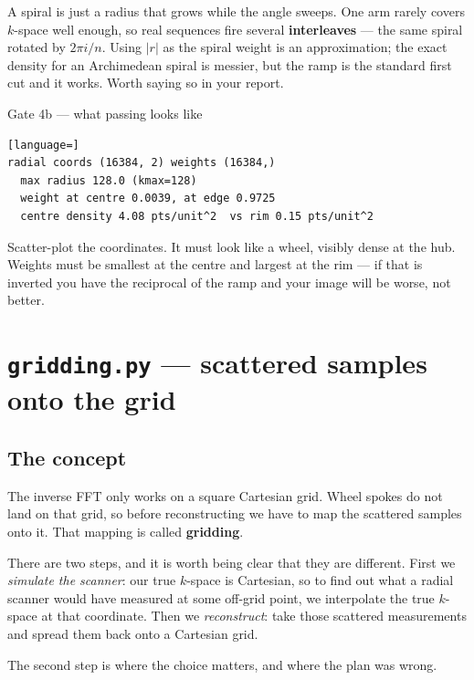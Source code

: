 \documentclass[11pt,a4paper]{article}
\begin{document}
A spiral is just a radius that grows while the angle sweeps. One arm rarely
covers $k$-space well enough, so real sequences fire several \textbf{interleaves}
--- the same spiral rotated by $2\pi i / n$. Using $|r|$ as the spiral weight is
an approximation; the exact density for an Archimedean spiral is messier, but the
ramp is the standard first cut and it works. Worth saying so in your report.

\begin{gatebox}{Gate 4b --- what passing looks like}
\begin{lstlisting}[language=]
radial coords (16384, 2) weights (16384,)
  max radius 128.0 (kmax=128)
  weight at centre 0.0039, at edge 0.9725
  centre density 4.08 pts/unit^2  vs rim 0.15 pts/unit^2
\end{lstlisting}
Scatter-plot the coordinates. It must look like a wheel, visibly dense at the
hub. Weights must be smallest at the centre and largest at the rim --- if that is
inverted you have the reciprocal of the ramp and your image will be worse, not
better.
\end{gatebox}

\section{\texttt{gridding.py} --- scattered samples onto the grid}

\subsection{The concept}

The inverse FFT only works on a square Cartesian grid. Wheel spokes do not land
on that grid, so before reconstructing we have to map the scattered samples onto
it. That mapping is called \textbf{gridding}.

There are two steps, and it is worth being clear that they are different. First
we \emph{simulate the scanner}: our true $k$-space is Cartesian, so to find out
what a radial scanner would have measured at some off-grid point, we interpolate
the true $k$-space at that coordinate. Then we \emph{reconstruct}: take those
scattered measurements and spread them back onto a Cartesian grid.

The second step is where the choice matters, and where the plan was wrong.
\end{document}
